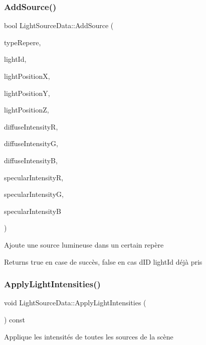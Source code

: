 \subsubsection{\texorpdfstring{AddSource()}{AddSource()}}
{\footnotesize\ttfamily bool Light\+Source\+Data\+::\+Add\+Source (\begin{DoxyParamCaption}\item[{\mbox{\hyperlink{classLightSourceData_abdbcb37900b8147487551a3afcdd90f5}{Light\+Source\+Data\+::\+Type\+Repere}}}]{type\+Repere,  }\item[{int}]{light\+Id,  }\item[{float}]{light\+PositionX,  }\item[{float}]{light\+PositionY,  }\item[{float}]{light\+PositionZ,  }\item[{float}]{diffuse\+IntensityR,  }\item[{float}]{diffuse\+IntensityG,  }\item[{float}]{diffuse\+IntensityB,  }\item[{float}]{specular\+IntensityR,  }\item[{float}]{specular\+IntensityG,  }\item[{float}]{specular\+IntensityB }\end{DoxyParamCaption})}

Ajoute une source lumineuse dans un certain repère \begin{DoxyReturn}{Returns}
true en case de succès, false en cas d\textquotesingle{}ID light\+Id déjà pris 
\end{DoxyReturn}
\mbox{\label{classLightSourceData_af5a955ec2f37cf81c74b370586afe3a8}} 
\subsubsection{\texorpdfstring{ApplyLightIntensities()}{ApplyLightIntensities()}}
{\footnotesize\ttfamily void Light\+Source\+Data\+::\+Apply\+Light\+Intensities (\begin{DoxyParamCaption}{ }\end{DoxyParamCaption}) const}

Applique les intensités de toutes les sources de la scène \mbox{\label{classLightSourceData_a2a6123eb077ef75ade0448bf3273d9e3}} 
